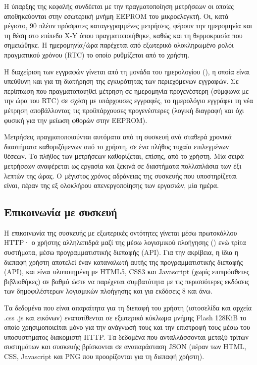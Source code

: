 Η ύπαρξης της κεφαλής συνδέεται με την πραγματοποίηση μετρήσεων οι οποίες
αποθηκεύονται στην εσωτερική μνήμη EEPROM του μικροελεγκτή. Οι, κατά μέγιστο, 90
πλέον πρόσφατες καταγεγραμμένες μετρήσεις, φέρουν την ημερομηνία και τη θέση στο
επίπεδο X-Y όπου πραγματοποιήθηκε, καθώς και τη θερμοκρασία που σημειώθηκε.
Η ημερομηνία\slash{}ώρα παρέχεται από εξωτερικό ολοκληρωμένο ρολόι πραγματικού
χρόνου (RTC) το οποίο ρυθμίζεται από το χρήστη.

Η διαχείριση των εγγραφών γίνεται από τη μονάδα του ημερολογίου (), η
οποία είναι υπεύθυνη και για τη διατήρηση της εγκυρότητας των περιεχόμενων
εγγραφών. Σε περίπτωση που πραγματοποιηθεί μέτρηση σε ημερομηνία προγενέστερη
(σύμφωνα με την ώρα του RTC) σε σχέση με υπάρχουσες εγγραφές, το ημερολόγιο
εγγράφει τη νέα μέτρηση αποβάλλοντας τις προϋπάρχουσες προγενέστερες (λογική
διαγραφή και όχι φυσική για την μείωση φθορών στην EEPROM).

Μετρήσεις πραγματοποιούνται αυτόματα από τη συσκευή ανά σταθερά χρονικά
διαστήματα καθοριζόμενων από το χρήστη, σε ένα πλήθος τυχαία επιλεγμένων θέσεων.
Το πλήθος των μετρήσεων καθορίζεται, επίσης, από το χρήστη. Μία σειρά μετρήσεων
αναφέρεται ως εργασία και ξεκινά σε διαστήματα πολλαπλάσια των έξι λεπτών της
ώρας. Ο μέγιστος χρόνος αδράνειας της συσκευής που υποστηρίζεται είναι, πέραν
της εξ ολοκλήρου απενεργοποίησης των εργασιών, μία ημέρα.


\subsection{Επικοινωνία με συσκευή}

Η επικοινωνία της συσκευής με εξωτερικές οντότητες γίνεται μέσω πρωτοκόλλου
HTTP· ο χρήστης αλληλεπιδρά μαζί της μέσω λογισμικού πλοήγησης ()
ενώ τρίτα συστήματα, μέσω προγραμματιστικής διεπαφής (API).
Για την ακρίβεια, η ίδια η διεπαφή χρήστη αποτελεί έναν καταναλωτή αυτής της
προγραμματιστικής διεπαφής (API), και είναι υλοποιημένη με HTML5, CSS3 και
Javascript (χωρίς επιπρόσθετες βιβλιοθήκες) σε βαθμό ώστε να παρέχεται
συμβατότητα με τις περισσότερες εκδόσεις των δημοφιλέστερων λογισμικών πλοήγησης
και για εκδόσεις  8 και άνω.

Τα δεδομένα που είναι απαραίτητα για τη διεπαφή του χρήστη (ιστοσελίδα και
αρχεία \@.css \@.js και εικόνων) εναποτίθενται σε εξωτερικό κύκλωμα μνήμης Flash
128KiB το οποίο χρησιμοποιείται μόνο για την ανάγνωσή τους και την επιστροφή
τους μέσω του υποσυστήματος διακομιστή HTTP.
Τα δεδομένα που ανταλλάσσονται μεταξύ τρίτων συστημάτων και συσκευής βρίσκονται
σε αναπαράσταση JSON (πέραν των HTML, CSS, Javascript και PNG που προορίζονται
για τη διεπαφή χρήστη).

